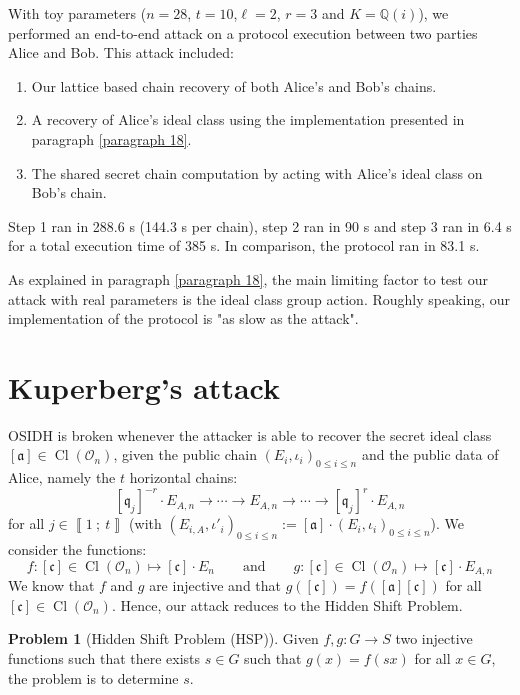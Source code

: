 \documentclass[a4paper,10pt]{report}
\theoremstyle{definition}
\theoremstyle{plain}
\theoremstyle{definition}
\newtheorem{problem}[definition]{Problem}
\newcommand{\Q}{\mathbb{Q}}
\newcommand{\mO}{\mathcal{O}}
\renewcommand{\i}[2]{\left\llbracket #1~;~#2\right\rrbracket}
\renewcommand{\(}{\left(}
\renewcommand{\)}{\right)}
\newcommand{\mf}[1]{\mathfrak{#1}}
\DeclareMathOperator{\Cl}{Cl}
\begin{document}
With toy parameters ($n=28$, $t=10$,$\ell=2$, $r=3$ and $K=\Q(i)$), we performed an end-to-end attack on a protocol execution between two parties Alice and Bob. This attack included:
\begin{enumerate}
\item Our lattice based chain recovery of both Alice's and Bob's chains.
\item A recovery of Alice's ideal class using the implementation presented in paragraph \ref{paragraph 18}.
\item The shared secret chain computation by acting with Alice's ideal class on Bob's chain.
\end{enumerate}
Step 1 ran in 288.6 s (144.3 s per chain), step 2 ran in 90 s and step 3 ran in 6.4 s for a total execution time of 385 s. In comparison, the protocol ran in 83.1 s.

As explained in paragraph \ref{paragraph 18}, the main limiting factor to test our attack with real parameters is the ideal class group action. Roughly speaking, our implementation of the protocol is "as slow as the attack".

\section{Kuperberg's attack}

OSIDH is broken whenever the attacker is able to recover the secret ideal class $[\mf{a}]\in\Cl(\mO_n)$, given the public chain $(E_i,\iota_i)_{0\leq i\leq n}$ and the public data of Alice, namely the $t$ horizontal chains:
\[[\mf{q}_j]^{-r}\cdot E_{A,n}\longrightarrow \cdots \longrightarrow E_{A,n} \longrightarrow \cdots \longrightarrow [\mf{q}_j]^{r}\cdot E_{A,n}\]
for all $j\in\i{1}{t}$ (with $(E_{i,A},\iota'_i)_{0\leq i\leq n}:=[\mf{a}]\cdot (E_i,\iota_i)_{0\leq i\leq n}$). We consider the functions:
\[f: [\mf{c}]\in\Cl(\mO_n)\longmapsto [\mf{c}]\cdot E_n \qquad \mbox{and} \qquad g: [\mf{c}]\in\Cl(\mO_n)\longmapsto [\mf{c}]\cdot E_{A,n}\]
We know that $f$ and $g$ are injective and that $g([\mf{c}])=f([\mf{a}][\mf{c}])$ for all $[\mf{c}]\in\Cl(\mO_n)$. Hence, our attack reduces to the Hidden Shift Problem.

\begin{problem}[Hidden Shift Problem (HSP)]\label{problem 4}
Given $f,g: G\longrightarrow S$ two injective functions such that there exists $s\in G$ such that $g(x)=f(sx)$ for all $x\in G$, the problem is to determine $s$.
\end{problem}
\end{document}
